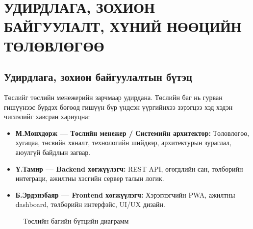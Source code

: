 \chapter{УДИРДЛАГА, ЗОХИОН БАЙГУУЛАЛТ, ХҮНИЙ НӨӨЦИЙН ТӨЛӨВЛӨГӨӨ}

\section{Удирдлага, зохион байгуулалтын бүтэц}

Төслийг төслийн менежерийн зарчмаар удирдана. Төслийн баг нь гурван
гишүүнээс бүрдэх бөгөөд гишүүн бүр үндсэн үүргийнхээ зэрэгцээ хэд хэдэн
чиглэлийг хавсран хариуцна:

\begin{itemize}
  \item \textbf{М.Мөнхдорж — Төслийн менежер / Системийн архитектор:}
        Төлөвлөгөө, хугацаа, төсвийн хяналт, технологийн шийдвэр,
        архитектурын зураглал, аюулгүй байдлын загвар.
  \item \textbf{Ү.Тамир — Backend хөгжүүлэгч:} REST API, өгөгдлийн сан,
        төлбөрийн интеграци, ажилтны хэсгийн сервер талын логик.
  \item \textbf{Б.Эрдэнэбаяр — Frontend хөгжүүлэгч:} Хэрэглэгчийн PWA,
        ажилтны dashboard, төлбөрийн интерфэйс, UI/UX дизайн.
\end{itemize}

\begin{figure}[h]
  \centering
  \caption{Төслийн багийн бүтцийн диаграмм}
  \label{fig:ch4-bag}
\end{figure}

